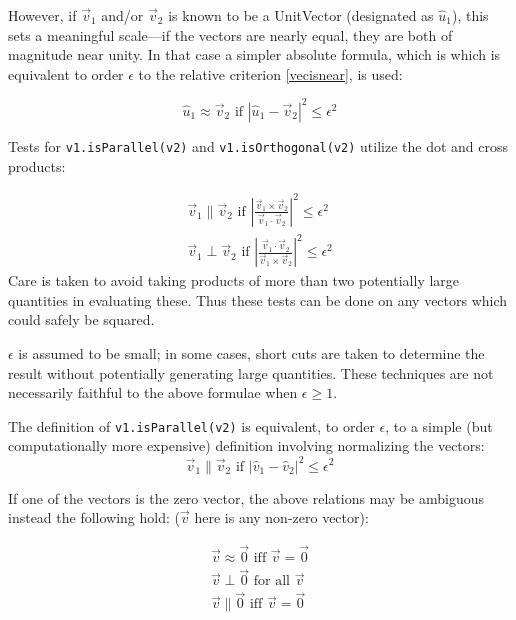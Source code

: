 \documentclass[twoside,12pt]{article}
\begin{document}
\noindent
However, if $\vec{v}_{1}$ and/or $\vec{v}_2$ is known to be a UnitVector
(designated as $\hat{u}_{1}$), this sets a meaningful scale---if the
vectors are nearly equal, they are both of magnitude near unity.
In that case a simpler absolute formula, which is which is equivalent
to order $\epsilon$ to the relative criterion \ref{vecisnear}, is used:

\begin{equation}
\hat{u}_{1} \approx \vec{v}_{2} \mbox{ if }
  \left| \hat{u}_{1} - \vec{v}_{2} \right| ^ 2 \leq \epsilon^2
\end{equation}

\noindent
Tests for {\tt v1.isParallel(v2)}
and {\tt v1.isOrthogonal(v2)} utilize the dot and
cross products:

\begin{eqnarray}
\vec{v}_{1} \parallel \vec{v}_{2} \mbox{ if }
  \left| \frac{\vec{v}_{1} \times \vec{v}_{2}}
  {\vec{v}_{1} \cdot  \vec{v}_{2}}  \right| ^2
  \le \epsilon^2
  \label{eq:isPar} \\
\vec{v}_{1} \perp \vec{v}_{2} \mbox{ if }
  \left| \frac{\vec{v}_{1} \cdot \vec{v}_{2}}
  {\vec{v}_{1} \times  \vec{v}_{2}}  \right| ^2
  \le \epsilon^2
  \label{eq:isOrtho}
\end{eqnarray}
\noindent
Care is taken to avoid taking products of more than two potentially large
quantities in evaluating these.  Thus these tests can be done on any vectors
which could safely be squared.

\noindent
$\epsilon$ is assumed to be small; in some cases, short cuts are taken
to determine the result without potentially generating large quantities.
These techniques are not necessarily faithful to the above formulae when
$\epsilon \ge 1$.

\noindent
The definition of {\tt v1.isParallel(v2)} is equivalent, to order $\epsilon$,
to a simple (but computationally more expensive) definition involving
normalizing the vectors:
\begin{displaymath}
  \vec{v}_{1} \parallel \vec{v}_{2} \mbox{ if }
  	\left| \hat{v}_{1} - \hat{v}_{2} \right| ^2  \le \epsilon^2
\end{displaymath}


\noindent
If one of the vectors is the zero vector, the above relations may be ambiguous
instead the following hold:
($\vec{v}$ here is any non-zero vector):

\begin{eqnarray}
  \vec{v} \approx \vec{0} \mbox{ iff } \vec{v} = \vec{0} \\
  \vec{v} \perp \vec{0} \mbox{ for all } \vec{v} \\
  \vec{v} \parallel \vec{0} \mbox{ iff } \vec{v} = \vec{0}
\end{eqnarray}
\end{document}
